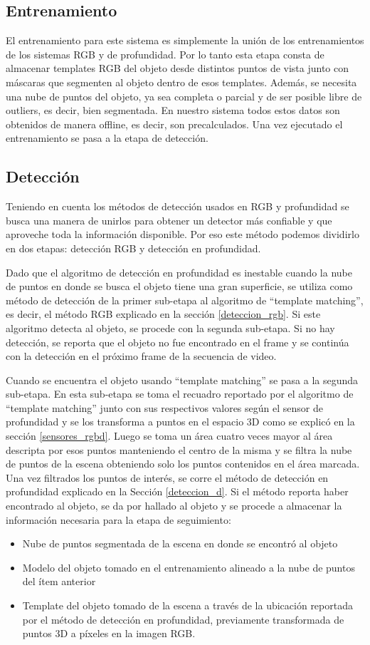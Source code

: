 \subsection{Entrenamiento}
El entrenamiento para este sistema es simplemente la unión de los entrenamientos de los sistemas RGB y de profundidad. Por lo tanto esta etapa consta de almacenar templates RGB del objeto desde distintos puntos de vista junto con máscaras que segmenten al objeto dentro de esos templates. Además, se necesita una nube de puntos del objeto, ya sea completa o parcial y de ser posible libre de outliers, es decir, bien segmentada. En nuestro sistema todos estos datos son obtenidos de manera offline, es decir, son precalculados. Una vez ejecutado el entrenamiento se pasa a la etapa de detección.

\subsection{Detección}
Teniendo en cuenta los métodos de detección usados en RGB y profundidad se busca una manera de unirlos para obtener un detector más confiable y que aproveche toda la información disponible. Por eso este método podemos dividirlo en dos etapas: detección RGB y detección en profundidad.

Dado que el algoritmo de detección en profundidad es inestable cuando la nube de puntos en donde se busca el objeto tiene una gran superficie, se utiliza como método de detección de la primer sub-etapa al algoritmo de ``template matching'', es decir, el método RGB explicado en la sección \ref{deteccion_rgb}. Si este algoritmo detecta al objeto, se procede con la segunda sub-etapa. Si no hay detección, se reporta que el objeto no fue encontrado en el frame y se continúa con la detección en el próximo frame de la secuencia de video.

Cuando se encuentra el objeto usando ``template matching'' se pasa a la segunda sub-etapa. En esta sub-etapa se toma el recuadro reportado por el algoritmo de ``template matching'' junto con sus respectivos valores según el sensor de profundidad y se los transforma a puntos en el espacio 3D como se explicó en la sección \ref{sensores_rgbd}. Luego se toma un área cuatro veces mayor al área descripta por esos puntos manteniendo el centro de la misma y se filtra la nube de puntos de la escena obteniendo solo los puntos contenidos en el área marcada. Una vez filtrados los puntos de interés, se corre el método de detección en profundidad explicado en la Sección \ref{deteccion_d}. Si el método reporta haber encontrado al objeto, se da por hallado al objeto y se procede a almacenar la información necesaria para la etapa de seguimiento:
\begin{itemize}
	\item Nube de puntos segmentada de la escena en donde se encontró al objeto
	\item Modelo del objeto tomado en el entrenamiento alineado a la nube de puntos del ítem anterior
	\item Template del objeto tomado de la escena a través de la ubicación reportada por el método de detección en profundidad, previamente transformada de puntos 3D a píxeles en la imagen RGB.
\end{itemize}

